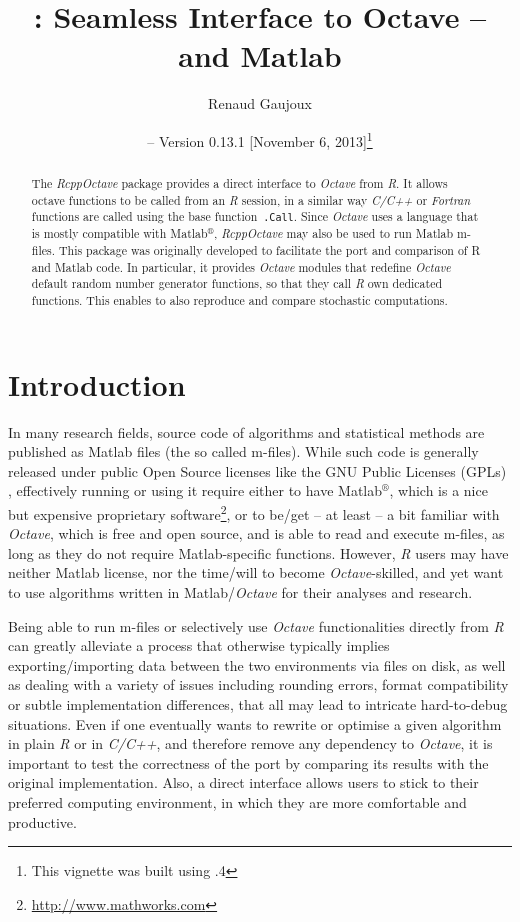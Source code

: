 \documentclass[english,10pt,a4paper]{article}\usepackage[]{graphicx}\usepackage[]{color}
\author{Renaud Gaujoux}
\title{\pkgname{RcppOctave}: Seamless Interface to Octave -- and Matlab}
\date{\Rpkg{RcppOctave} -- Version 0.13.1
[November  6, 2013]\footnote{This vignette was built using \octave
3.6.4}}
\newcommand{\matlab}{Matlab$^\circledR$\xspace}
\let\proglang=\textit
\let\code=\texttt
\newcommand{\pkgname}[1]{\textit{#1}\xspace}
\newcommand{\Rpkg}[1]{\pkgname{#1} package\xspace}
\newcommand{\R}{\proglang{R}\xspace}
\newcommand{\octave}{\proglang{Octave}\xspace}
\begin{document}
\maketitle

\begin{abstract}
The \Rpkg{RcppOctave} provides a direct interface to \octave from
\R.
It allows \\octave functions to be called from an \R session,
in a similar way \proglang{C/C++} or \proglang{Fortran} functions are called using the base function~\code{.Call}.
Since \octave uses a language that is mostly compatible with \matlab,
\pkgname{RcppOctave} may also be used to run Matlab m-files.
This package was originally developed to facilitate the port and comparison of R
and Matlab code.
In particular, it provides \octave modules that redefine
\octave default random number generator functions, so that they call
\proglang{R} own dedicated functions.
This enables to also reproduce and compare stochastic computations.
\end{abstract}

\noindent\hrulefill
\tableofcontents
\noindent\hrulefill

\section{Introduction}

In many research fields, source code of algorithms and statistical methods are
published as Matlab files (the so called m-files).
While such code is generally released under public Open Source licenses like the
GNU Public Licenses (GPLs) \cite{gnuGPL}, effectively running or using it
require either to have \matlab, which is a nice but expensive proprietary
software\footnote{\url{http://www.mathworks.com}}, or to be/get -- at least -- a bit familiar with \octave \cite{Eaton2002}, which is free and open source, and is able to read and execute m-files, as long as they do not require Matlab-specific functions.
However, \proglang{R} users may have neither Matlab license, nor the
time/will to become \octave-skilled, and yet want to use algorithms written in
Matlab/\octave for their analyses and research.

Being able to run m-files or selectively use \octave functionalities
directly from \proglang{R} can greatly alleviate a process that otherwise
typically implies exporting/importing data between the two environments via
files on disk, as well as dealing with a variety of issues including
rounding errors, format compatibility or subtle implementation differences,
that all may lead to intricate hard-to-debug situations.
Even if one eventually wants to rewrite or optimise a given algorithm in plain
\proglang{R} or in \proglang{C/C++}, and therefore remove any dependency to
\octave, it is important to test the correctness of the port by
comparing its results with the original implementation.
Also, a direct interface allows users to stick to their preferred computing
environment, in which they are more comfortable and productive.
\end{document}
